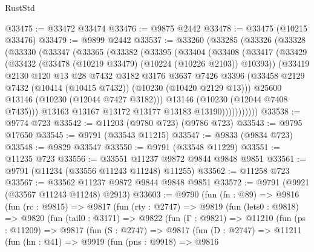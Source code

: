 \begin{lexlean}{RustStd}
\begin{coremodule}
@33475 := @33472 @33474
@33476 := @9875 @2442
@33478 := @33475 (@10215 @33476)
@33479 := @9899 @2442
@33537 := @33260
    (@33285
      (@33326
        (@33328
          (@33330
            (@33347
              (@33365
                (@33382
                  (@33395
                    (@33404
                      (@33408
                        (@33417
                          (@33429
                            (@33432 (@33478 (@10219 @33479) (@10224 (@10226 @2103)) @10393))
                            (@33419
                              @2130
                              @120
                              @13
                              @28
                              @7432
                              @3182
                              @3176
                              @3637
                              @7426
                              @3396
                              (@33458
                                @2129
                                @7432
                                (@10414 (@10415 @7432))
                                (@10230 (@10420 @2129 @13)))
                              @25600
                              @13146
                              (@10230 (@12044 @7427 @3182)))
                            @13146
                            (@10230 (@12044 @7408 @7435)))
                          @13163
                          @13167
                          @13172
                          @13177
                          @13183
                          @13190)))))))))))
@33538 := @9774 @723
@33542 := @11203 (@9780 @723) (@9786 @723)
@33543 := @9795 @17650
@33545 := @9791 (@33543 @11215)
@33547 := @9833 (@9834 @723)
@33548 := @9829 @33547
@33550 := @9791 (@33548 @11229)
@33551 := @11235 @723
@33556 := @33551 @11237 @9872 @9844 @9848 @9851
@33561 := @9791 (@11234 (@33556 @11243 @11248) @11255)
@33562 := @11258 @723
@33567 := @33562 @11237 @9872 @9844 @9848 @9851
@33572 := @9791 (@9921 (@33567 @11243 @11248) @2913)
@33603 := @9790
    (fun (fn : @89) =>
    @9816
      (fun (rc : @9815) =>
      @9817
        (fun (rty : @2747) =>
        @9819
          (fun (lets0 : @9818) =>
          @9820
            (fun (tail0 : @3171) =>
            @9822
              (fun (Γ : @9821) =>
              @11210
                (fun (ps : @11209) =>
                @9817
                  (fun (S : @2747) =>
                  @9817
                    (fun (D : @2747) =>
                    @11211
                      (fun (hn : @41) =>
                      @9919
                        (fun (pns : @9918) =>
                        @9816

\end{coremodule}
\end{lexlean}
